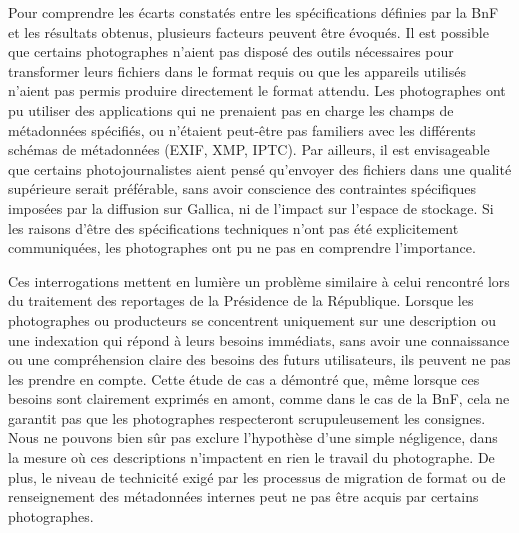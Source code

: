 Pour comprendre les écarts constatés entre les spécifications définies par la BnF et les résultats obtenus, plusieurs facteurs peuvent être évoqués. Il est possible que certains photographes n’aient pas disposé des outils nécessaires pour transformer leurs fichiers dans le format requis ou que les appareils utilisés n'aient pas permis produire directement le format attendu. Les photographes ont pu utiliser des applications qui ne prenaient pas en charge les champs de métadonnées spécifiés, ou n’étaient peut-être pas familiers avec les différents schémas de métadonnées (EXIF, XMP, IPTC). Par ailleurs, il est envisageable que certains photojournalistes aient pensé qu'envoyer des fichiers dans une qualité supérieure serait préférable, sans avoir conscience des contraintes spécifiques imposées par la diffusion sur Gallica, ni de l’impact sur l’espace de stockage. Si les raisons d'être des spécifications techniques n’ont pas été explicitement communiquées, les photographes ont pu ne pas en comprendre l'importance.

Ces interrogations mettent en lumière un problème similaire à celui rencontré lors du traitement des reportages de la Présidence de la République. Lorsque les photographes ou producteurs se concentrent uniquement sur une description ou une indexation qui répond à leurs besoins immédiats, sans avoir une connaissance ou une compréhension claire des besoins des futurs utilisateurs, ils peuvent ne pas les prendre en compte. Cette étude de cas a démontré que, même lorsque ces besoins sont clairement exprimés en amont, comme dans le cas de la BnF, cela ne garantit pas que les photographes respecteront scrupuleusement les consignes. Nous ne pouvons bien sûr pas exclure l'hypothèse d'une simple négligence, dans la mesure où ces descriptions n'impactent en rien le travail du photographe. De plus, le niveau de technicité exigé par les processus de migration de format ou de renseignement des métadonnées internes peut ne pas être acquis par certains photographes.

